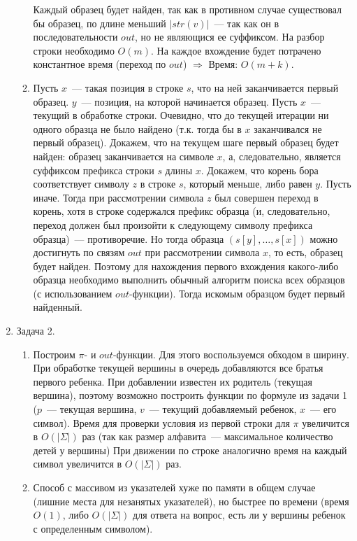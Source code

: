 \documentclass{article}
\begin{document}
\begin{enumerate}
\begin{enumerate}
Каждый образец будет найден, так как в противном случае существовал бы образец, по длине меньший $|str(v)|$~--- так как он в последовательности $out$, но не являющися ее суффиксом.
На разбор строки необходимо $O(m)$. На каждое вхождение будет потрачено константное время (переход по $out$) $\Rightarrow$\newline
Время: $O(m+k)$.
\item Пусть $x$~--- такая позиция в строке $s$, что на ней заканчивается первый образец. $y$~--- позиция, на которой начинается образец. Пусть $x$~--- текущий в обработке строки. Очевидно, что до текущей итерации ни одного образца не было найдено (т.к. тогда бы в $x$ заканчивался не первый образец).\newline
Докажем, что на текущем шаге первый образец будет найден: образец заканчивается на символе $x$, а, следовательно, является суффиксом префикса строки $s$ длины $x$.\newline
Докажем, что корень бора соответствует символу $z$ в строке $s$, который меньше, либо равен $y$. Пусть иначе. Тогда при рассмотрении символа $z$ был совершен переход в корень, хотя в строке содержался префикс образца (и, следовательно, переход должен был произойти к следующему символу префикса образца)~--- противоречие.\newline
Но тогда образца $(s[y],\dots,s[x])$ можно достигнуть по связям $out$ при рассмотрении символа $x$, то есть, образец будет найден.\newline
Поэтому для нахождения первого вхождения какого-либо образца необходимо выполнить обычный алгоритм поиска всех образцов (с использованием $out$-функции). Тогда искомым образцом будет первый найденный.
\end{enumerate}
\item Задача 2.
\begin{enumerate}
\item Построим $\pi$- и $out$-функции. Для этого воспользуемся обходом в ширину. При обработке текущей вершины в очередь добавляются все братья первого ребенка. При добавлении известен их родитель (текущая вершина), поэтому возможно построить функции по формуле из задачи 1 ($p$~--- текущая вершина, $v$~--- текущий добавляемый ребенок, $x$~--- его символ). Время для проверки условия из первой строки для $\pi$ увеличится в $O(|\Sigma|)$ раз (так как размер алфавита~--- максимальное количество детей у вершины)\newline
При движении по строке аналогично время на каждый символ увеличится в $O(|\Sigma|)$ раз.
\item Способ с массивом из указателей хуже по памяти в общем случае (лишние места для незанятых указателей), но быстрее по времени (время $O(1)$, либо $O(|\Sigma|)$ для ответа на вопрос, есть ли у вершины ребенок с определенным символом).
\end{enumerate}
\end{enumerate}
\end{document}
